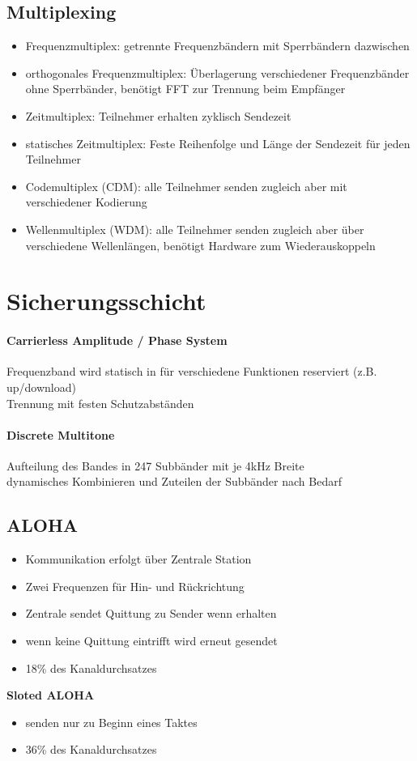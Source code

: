 \documentclass[12pt,a4paper]{article}
\begin{document}
\subsection{Multiplexing}
\begin{itemize}
\item Frequenzmultiplex: getrennte Frequenzbändern mit Sperrbändern dazwischen
\item orthogonales Frequenzmultiplex: Überlagerung verschiedener Frequenzbänder ohne Sperrbänder, benötigt FFT zur Trennung beim Empfänger
\item Zeitmultiplex: Teilnehmer erhalten zyklisch Sendezeit
\item statisches Zeitmultiplex: Feste Reihenfolge und Länge der Sendezeit für jeden Teilnehmer 
\item Codemultiplex (CDM): alle Teilnehmer senden zugleich aber mit verschiedener Kodierung
\item Wellenmultiplex (WDM): alle Teilnehmer senden zugleich aber über verschiedene Wellenlängen, benötigt Hardware zum Wiederauskoppeln
\end{itemize}

\section{Sicherungsschicht}
\paragraph{Carrierless Amplitude / Phase System}
Frequenzband wird statisch in für verschiedene Funktionen reserviert (z.B. up/download)\\
Trennung mit festen Schutzabständen
\paragraph{Discrete Multitone}
Aufteilung des Bandes in 247 Subbänder mit je 4kHz Breite\\
dynamisches Kombinieren und Zuteilen der Subbänder nach Bedarf

\subsection{ALOHA}
\begin{itemize}
\item Kommunikation erfolgt über Zentrale Station
\item Zwei Frequenzen für Hin- und Rückrichtung
\item Zentrale sendet Quittung zu Sender wenn erhalten
\item wenn keine Quittung eintrifft wird erneut gesendet
\item 18\% des Kanaldurchsatzes
\end{itemize}
\textbf{Sloted ALOHA}\\
\begin{itemize}
\item senden nur zu Beginn eines Taktes
\item 36\% des Kanaldurchsatzes
\end{itemize}
\end{document}
